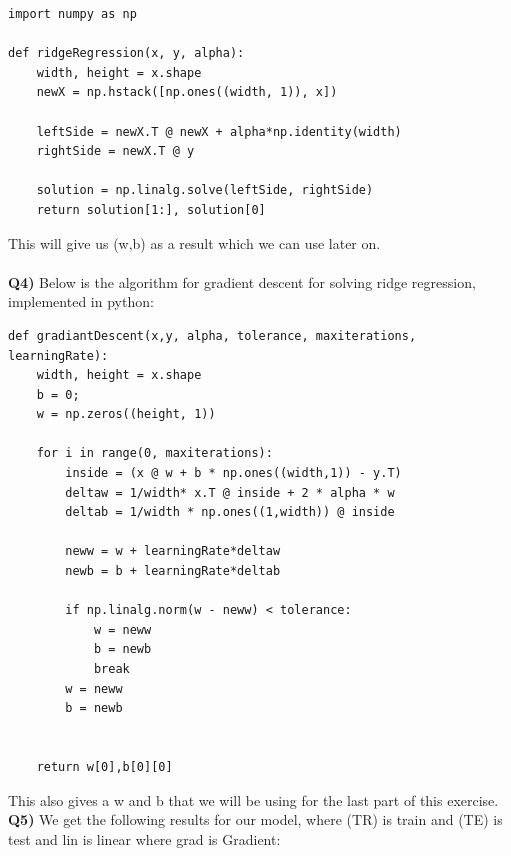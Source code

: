\documentclass{article}
\begin{document}
\begin{titlepage}
\begin{lstlisting}
import numpy as np

def ridgeRegression(x, y, alpha):
    width, height = x.shape
    newX = np.hstack([np.ones((width, 1)), x])

    leftSide = newX.T @ newX + alpha*np.identity(width)
    rightSide = newX.T @ y

    solution = np.linalg.solve(leftSide, rightSide)
    return solution[1:], solution[0]
\end{lstlisting} 
This will give us (w,b) as a result which we can use later on.\\\\
\textbf{Q4)} Below is the algorithm for gradient descent for solving ridge regression, implemented in python:
\begin{lstlisting}
def gradiantDescent(x,y, alpha, tolerance, maxiterations, learningRate):
    width, height = x.shape
    b = 0;
    w = np.zeros((height, 1))

    for i in range(0, maxiterations):
        inside = (x @ w + b * np.ones((width,1)) - y.T)
        deltaw = 1/width* x.T @ inside + 2 * alpha * w
        deltab = 1/width * np.ones((1,width)) @ inside

        neww = w + learningRate*deltaw
        newb = b + learningRate*deltab

        if np.linalg.norm(w - neww) < tolerance:
            w = neww
            b = newb
            break
        w = neww
        b = newb


    return w[0],b[0][0]
\end{lstlisting} 
This also gives a w and b that we will be using for the last part of this exercise.
\newpage
\textbf{Q5)} We get the following results for our model, where (TR) is train and (TE) is test and lin is linear where grad is Gradient:\\


\end{titlepage}
\end{document}
